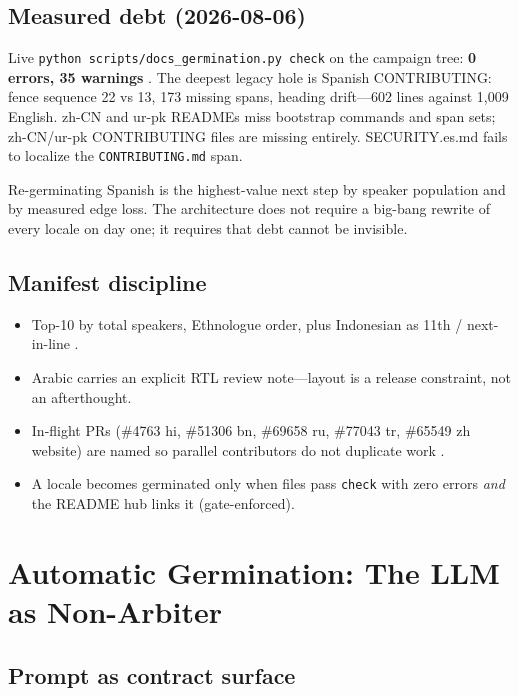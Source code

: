 \documentclass[11pt]{article}
\theoremstyle{definition}
\theoremstyle{plain}
\theoremstyle{remark}
\begin{document}
\subsection{Measured debt (2026-08-06)}

Live \texttt{python scripts/docs\_germination.py check} on the campaign tree:
\textbf{0 errors, 35 warnings} \citep{hermesspec}. The deepest legacy hole is
Spanish CONTRIBUTING: fence sequence 22 vs 13, 173 missing spans, heading
drift---602 lines against 1{,}009 English. zh-CN and ur-pk READMEs miss
bootstrap commands and span sets; zh-CN/ur-pk CONTRIBUTING files are missing
entirely. SECURITY.es.md fails to localize the \texttt{CONTRIBUTING.md} span.

Re-germinating Spanish is the highest-value next step by speaker population
and by measured edge loss. The architecture does not require a big-bang
rewrite of every locale on day one; it requires that debt cannot be invisible.

\subsection{Manifest discipline}

\begin{itemize}[leftmargin=*]
\item Top-10 by total speakers, Ethnologue order, plus Indonesian as 11th /
  next-in-line \citep{ethnologue,hermespr80391}.
\item Arabic carries an explicit RTL review note---layout is a release
  constraint, not an afterthought.
\item In-flight PRs (\#4763 hi, \#51306 bn, \#69658 ru, \#77043 tr, \#65549 zh
  website) are named so parallel contributors do not duplicate work
  \citep{hermesepic80392}.
\item A locale becomes germinated only when files pass \texttt{check} with
  zero errors \emph{and} the README hub links it (gate-enforced).
\end{itemize}


\section{Automatic Germination: The LLM as Non-Arbiter}
\label{sec:llm}

\subsection{Prompt as contract surface}
\end{document}

